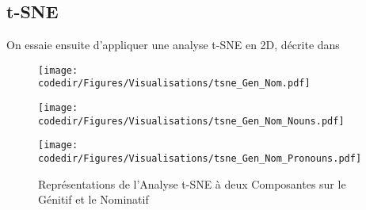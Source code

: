 \documentclass{cours}
\newcommand{\codedir}{Morphosyntactic-Categories_Code}
\begin{document}
\subsection{t-SNE}
On essaie ensuite d'appliquer une analyse t-SNE en 2D, décrite dans \cite{tSNE}
\begin{figure}[H]
    \begin{center}
        \begin{minipage}{.5\textwidth}
            \begin{center}
                \texttt{[image: \\codedir/Figures/Visualisations/tsne\_Gen\_Nom.pdf]}
            \end{center}
        \end{minipage}
    \end{center}

    \begin{minipage}{.5\textwidth}
        \begin{center}
            \texttt{[image: \\codedir/Figures/Visualisations/tsne\_Gen\_Nom\_Nouns.pdf]}
        \end{center}
    \end{minipage}
    \begin{minipage}{.5\textwidth}
        \begin{center}
            \texttt{[image: \\codedir/Figures/Visualisations/tsne\_Gen\_Nom\_Pronouns.pdf]}
        \end{center}
    \end{minipage}
    \caption{Représentations de l'Analyse t-SNE à deux Composantes sur le Génitif et le Nominatif}
\end{figure}



\newpage
\appendix




\appendix
\listoftables
\listoffigures
\end{document}
